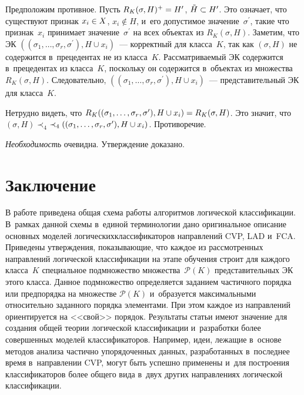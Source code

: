 \begin{multicols}{2}
  Предположим противное. Пусть $R_K(\sigma, H)^+ \hm= H^\prime$, 
$\tilde{H}\hm\subset H^\prime$. Это означает, что существуют при\-знак 
$x_i\hm\in X$, $x_i\not\in H$, и~его до\-пус\-ти\-мое значение~$\sigma^\prime$, 
такие что при\-знак~$x_i$ принимает значение~$\sigma^\prime$ на всех объектах 
из $R_K(\sigma, H)$. Заметим, что ЭК $((\sigma_1, \ldots , \sigma_r, 
\sigma^\prime), H\cup x_i)$~--- корректный для класса~$K$, так как $(\sigma, 
H)$ не содержится в~прецедентах не из класса~$K$. Рас\-смат\-ри\-ва\-емый ЭК 
содержится в~прецедентах из класса~$K$, поскольку он содержится в~объектах 
из множества $R_K(\sigma, H)$. Следовательно, $((\sigma_1, \ldots , \sigma_r, 
\sigma^\prime), H\cup x_i)$~--- пред\-ста\-ви\-тель\-ный ЭК для клас\-са~$K$. 
  
  Нетрудно видеть, что $R_K((\sigma_1, \ldots , \sigma_r, \sigma^\prime), H\hm\cup x_i)\hm= R_K(\sigma, H)$. 
  Это значит, что $(\sigma, H) \prec_4$\linebreak $\prec_4 ((\sigma_1, \ldots , \sigma_r, \sigma^\prime), H\hm\cup x_i)$. Противоречие. 
  
  \textit{Необходимость} очевидна. Утверж\-де\-ние до\-ка\-зано.
  
 \vspace*{-4pt}
  
\section{Заключение}

 \vspace*{-2pt}

  В работе приведена общая схема работы алгоритмов логической 
классификации. В~рамках данной схемы в~единой терминологии дано 
оригинальное описание основ\-ных моделей логических\linebreak \mbox{классификаторов} 
на\-прав\-ле\-ний CVP, LAD и~FCA. Приведены утверж\-де\-ния, по\-ка\-зы\-ва\-ющие, что 
каж\-дое из рас\-смот\-рен\-ных на\-прав\-ле\-ний логической классификации на этапе 
обуче\-ния строит для каж\-до\-го класса~$K$ специальное подмножество 
множества~$\mathcal{P}(K)$ пред\-ста\-ви\-тель\-ных ЭК этого класса. Данное 
подмножество определяется заданием час\-тич\-но\-го порядка или предпорядка на 
множестве $\mathcal{P}(K)$ и~образуется максимальными относительно 
заданного порядка элементами. При этом каждое из на\-прав\-ле\-ний 
ориентируется на <<свой>> порядок. Результаты \mbox{статьи} имеют значение для 
создания общей тео\-рии логической классификации и~разработки более 
совершенных моделей классификаторов. Например, идеи, лежащие в~основе 
методов анализа час\-ти\-чно упорядоченных данных, разработанных в~последнее 
время в~на\-прав\-ле\-нии CVP, могут быть успеш\-но применены и~для по\-стро\-ения 
классификаторов более общего вида в~двух других на\-прав\-ле\-ни\-ях логической 
клас\-си\-фи\-ка\-ции. 


\end{multicols}
